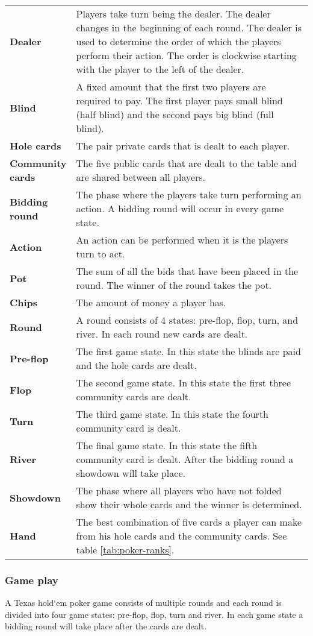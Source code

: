 \begin{tabular}{ p{0.18\linewidth} p{0.82\linewidth} }
\textbf{Dealer} & Players take turn being the dealer. The dealer changes in the beginning of each round. The dealer is used to determine the order of which the players perform their action. The order is clockwise starting with the player to the left of the dealer. \\
\textbf{Blind} & A fixed amount that the first two players are required to pay. The first player pays small blind (half blind) and the second pays big blind (full blind).\\
\textbf{Hole cards} & The pair private cards that is dealt to each player. \\
\textbf{Community cards} & The five public cards that are dealt to the table and are shared between all players.\\
\textbf{Bidding round} & The phase where the players take turn performing an action. A bidding round will occur in every game state.\\
\textbf{Action} & An action can be performed when it is the players turn to act.\\
\textbf{Pot} & The sum of all the bids that have been placed in the round. The winner of the round takes the pot.\\
\textbf{Chips} & The amount of money a player has.\\
\textbf{Round} & A round consists of 4 states: pre-flop, flop, turn, and river. In each round new cards are dealt.\\
\textbf{Pre-flop} & The first game state. In this state the blinds are paid and the hole cards are dealt.\\
\textbf{Flop} & The second game state. In this state the first three community cards are dealt.\\
\textbf{Turn} & The third game state. In this state the fourth community card is dealt.\\
\textbf{River} & The final game state. In this state the fifth community card is dealt. After the bidding round a showdown will take place.\\
\textbf{Showdown} & The phase where all players who have not folded show their whole cards and the winner is determined.\\
\textbf{Hand} & The best combination of five cards a player can make from his hole cards and the community cards. See table \ref{tab:poker-ranks}.
\end{tabular}

\subsubsection*{Game play}
A Texas hold`em poker game consists of multiple rounds and each round is divided into four game states: pre-flop, flop, turn and river. In each game state a bidding round will take place after the cards are dealt. 


